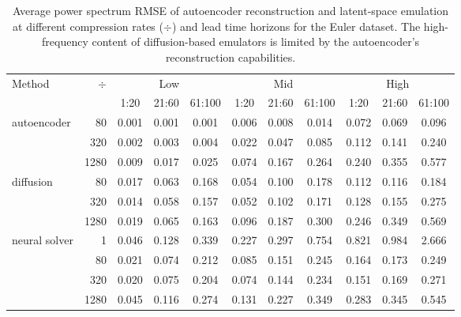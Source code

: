 \begin{subappendices}
\begin{table}[h]
    \centering
    \caption{Average power spectrum RMSE of autoencoder reconstruction and latent-space emulation at different compression rates ($\div$) and lead time horizons for the Euler dataset. The high-frequency content of diffusion-based emulators is limited by the autoencoder's reconstruction capabilities.}
    \footnotesize
    \begin{tabular}{lrccccccccc}
        \toprule
        \multirow[c]{2}{*}{Method} & \multirow[c]{2}{*}{$\div$ \hspace{0.1em}} & \multicolumn{3}{c}{Low} & \multicolumn{3}{c}{Mid} & \multicolumn{3}{c}{High} \\
        \cmidrule(lr){3-5} \cmidrule(lr){6-8} \cmidrule(lr){9-11}
         & & 1:20 & 21:60 & 61:100 & 1:20 & 21:60 & 61:100 & 1:20 & 21:60 & 61:100 \\
        \midrule
        \multirow[c]{3}{*}{autoencoder}
        & 80 & 0.001 & 0.001 & 0.001 & 0.006 & 0.008 & 0.014 & 0.072 & 0.069 & 0.096 \\
        & 320 & 0.002 & 0.003 & 0.004 & 0.022 & 0.047 & 0.085 & 0.112 & 0.141 & 0.240 \\
        & 1280 & 0.009 & 0.017 & 0.025 & 0.074 & 0.167 & 0.264 & 0.240 & 0.355 & 0.577 \\
        \midrule
        \multirow[c]{3}{*}{diffusion}
        & 80 & 0.017 & 0.063 & 0.168 & 0.054 & 0.100 & 0.178 & 0.112 & 0.116 & 0.184 \\
        & 320 & 0.014 & 0.058 & 0.157 & 0.052 & 0.102 & 0.171 & 0.128 & 0.155 & 0.275 \\
        & 1280 & 0.019 & 0.065 & 0.163 & 0.096 & 0.187 & 0.300 & 0.246 & 0.349 & 0.569 \\
        \midrule
        \multirow[c]{4}{*}{neural solver}
        & 1 & 0.046 & 0.128 & 0.339 & 0.227 & 0.297 & 0.754 & 0.821 & 0.984 & 2.666 \\
        & 80 & 0.021 & 0.074 & 0.212 & 0.085 & 0.151 & 0.245 & 0.164 & 0.173 & 0.249 \\
        & 320 & 0.020 & 0.075 & 0.204 & 0.074 & 0.144 & 0.234 & 0.151 & 0.169 & 0.271 \\
        & 1280 & 0.045 & 0.116 & 0.274 & 0.131 & 0.227 & 0.349 & 0.283 & 0.345 & 0.545 \\
        \bottomrule
    \end{tabular}
    \label{tab:euler-power-rmse}
\end{table}


\end{subappendices}
